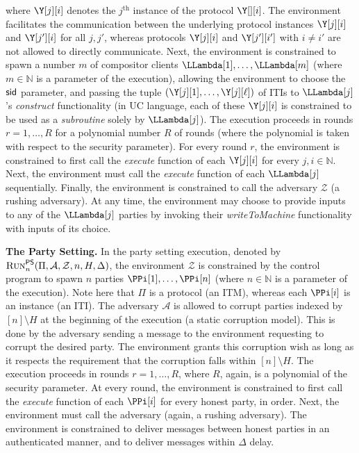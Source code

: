 where $\Y[j][i]$ denotes the $j^\text{th}$ instance of
the protocol $\Y[][i]$. The environment facilitates the communication
between the underlying protocol instances $\Y[j][i]$ and $\Y[j'][i]$
for all $j, j'$, whereas protocols $\Y[j][i]$ and $\Y[j'][i']$
with $i \neq i'$ are not allowed to directly communicate.
Next, the environment is constrained to spawn
a number $m$ of compositor clients
$\LLambda[1], \ldots, \LLambda[m]$ (where $m \in \mathbb{N}$
is a parameter of the execution), allowing
the environment to choose the $\textsf{sid}$ parameter,
and passing the tuple $(\Y[j][1], \ldots, \Y[j][\ell])$ of ITIs
to $\LLambda[j]$'s \emph{construct} functionality
(in UC language, each of these $\Y[j][i]$ is constrained to be used
as a \emph{subroutine} solely by $\LLambda[j]$).
The execution proceeds in rounds $r = 1, \ldots, R$
for a polynomial number $R$ of rounds (where the polynomial
is taken with respect to the security parameter). For every
round $r$, the environment is constrained to first call
the \emph{execute} function of each $\Y[j][i]$ for every
$j, i \in \mathbb{N}$. Next, the environment must call
the \emph{execute} function of each $\LLambda[j]$ sequentially.
Finally, the environment is constrained to call the
adversary $\mathcal{Z}$ (a rushing adversary).
At any time, the environment may choose to provide inputs
to any of the $\LLambda[j]$ parties by invoking their \emph{writeToMachine}
functionality with inputs of its choice.

\noindent
\textbf{The Party Setting.}
In the party setting execution, denoted by $\textsc{Run}^{\textsf{PS}}_n(\Pi, \mathcal{A}, \mathcal{Z}, n, H, \Delta)$,
the environment $\mathcal{Z}$ is constrained by the control program
to spawn $n$ parties $\PPi[1], \ldots, \PPi[n]$ (where $n \in \mathbb{N}$
is a parameter of the execution). Note here that $\Pi$ is a protocol (an ITM),
whereas each $\PPi[i]$ is an instance (an ITI).
The adversary $\mathcal{A}$ is allowed to corrupt parties
indexed by $[n] \setminus H$ at the beginning of the execution
(a static corruption model). This is done by the adversary sending a message
to the environment requesting to corrupt the desired party. The environment
grants this corruption wish as long as it respects the requirement that the
corruption falls within $[n] \setminus H$.
The execution proceeds in rounds
$r = 1, \ldots, R$, where $R$, again, is a polynomial of the security
parameter. At every round, the environment is constrained to first
call the \emph{execute} function of each $\PPi[i]$ for every
honest party, in order. Next, the environment must call
the adversary (again, a rushing adversary). The environment
is constrained to deliver messages between honest parties
in an authenticated manner, and to deliver messages within $\Delta$
delay.

